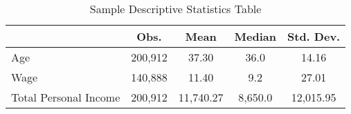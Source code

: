 \begin{table}[htbp]\centering
\def\sym#1{\ifmmode^{#1}\else\(^{#1}\)\fi}
\caption{Sample Descriptive Statistics Table\label{descriptive1}}
\begin{tabular}{l*{1}{cccc}}
\toprule
                    &        Obs.&        Mean&      Median&   Std. Dev.\\
\midrule
Age                 &     200,912&       37.30&        36.0&       14.16\\
Wage                &     140,888&       11.40&         9.2&       27.01\\
Total Personal Income&     200,912&   11,740.27&     8,650.0&   12,015.95\\
\bottomrule
\end{tabular}
\end{table}
